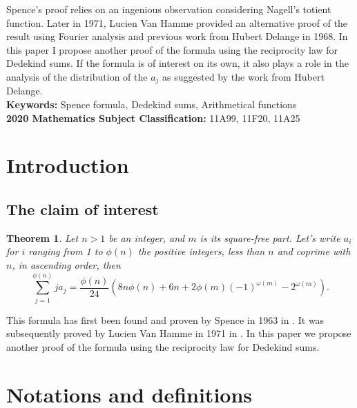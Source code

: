 \documentclass[a4paper,12pt]{article}
\newtheorem{theorem}{Theorem}[section]
\begin{document}
Spence's proof relies on an ingenious observation considering Nagell's totient function. 
Later in 1971, Lucien Van Hamme provided an alternative proof of the result using Fourier analysis and previous work from Hubert Delange in 1968. In this paper I propose another proof of the formula using the reciprocity law for Dedekind sums. If the formula is of interest on its own, it also plays a role in the analysis of the distribution of the $a_j$ as suggested by the work from Hubert Delange. \\

{\bf Keywords:} Spence formula, Dedekind sums, Arithmetical functions \\ %
{\bf 2020 Mathematics Subject Classification:} 11A99, 11F20, 11A25
\vspace{5mm}

\section{Introduction}

\subsection{The claim of interest}

\begin{theorem} Let $n>1$ be an integer, and $m$ is its square-free part. Let's write $a_i$ for $i$ ranging from 1 to $\phi(n)$ the positive integers, less than $n$ and coprime with $n$, in ascending order, then
\begin{equation}\label{eq:Spence_formula}
\sum_{j=1}^{\phi(n)}ja_j= \frac{\phi(n)}{24}\left(8n\phi(n)+6n+2\phi(m){(-1)}^{\omega(m)}-2^{\omega(m)} \right).
\end{equation}
\end{theorem}

This formula has first been found and proven by Spence in 1963 in \cite{spence1963formulae}. It was subsequently proved by Lucien Van Hamme in 1971 in \cite{van1971generalisation}. In this paper we propose another proof of the formula using the reciprocity law for Dedekind sums.

\section{Notations and definitions}
\end{document}
